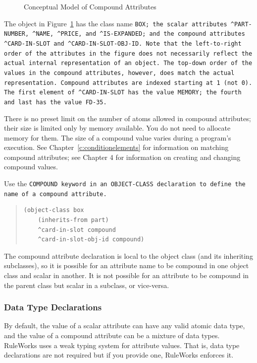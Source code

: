 \begin{figure}[h]
  \centering
  
  \caption{Conceptual Model of Compound Attributes}
  \label{f:2-6}
\end{figure}

The object in Figure~\ref{f:2-6} has the class name \tt{BOX}; the scalar
attributes \verb|^PART-NUMBER|, \verb|^NAME|, \verb|^PRICE|, and
\verb|^IS-EXPANDED|; and the compound attributes \verb|^CARD-IN-SLOT|
and \verb|^CARD-IN-SLOT-OBJ-ID|. Note that the left-to-right order of
the attributes in the figure does not necessarily reflect the actual
internal representation of an object. The top-down order of the values
in the compound attributes, however, does match the actual
representation. Compound attributes are indexed starting at 1 (not
0). The first element of \verb|^CARD-IN-SLOT| has the value
\verb|MEMORY|; the fourth and last has the value \verb|FD-35|.

There is no preset limit on the number of atoms allowed in compound
attributes; their size is limited only by memory available. You do not
need to allocate memory for them. The size of a compound value varies
during a program's execution.  See Chapter~\ref{c:conditionelements}
for information on matching compound attributes; see Chapter 4 for
information on creating and changing compound values.

Use the \tt{COMPOUND} keyword in an \tt{OBJECT-CLASS} declaration to
define the name of a compound attribute.
\begin{quote}
\begin{verbatim}
(object-class box
    (inherits-from part)
    ^card-in-slot compound
    ^card-in-slot-obj-id compound)
\end{verbatim}
\end{quote}

The compound attribute declaration is local to the object
class (and its inheriting subclasses), so it is possible for
an attribute name to be compound in one object class and
scalar in another. It is not possible for an attribute to be
compound in the parent class but scalar in a subclass, or
vice-versa.

\subsubsection{Data Type Declarations}

By default, the value of a scalar attribute can have any
valid atomic data type, and the value of a compound attribute
can be a mixture of data types. RuleWorks uses a weak typing
system for attribute values. That is, data type declarations
are not required but if you provide one, RuleWorks enforces
it.

